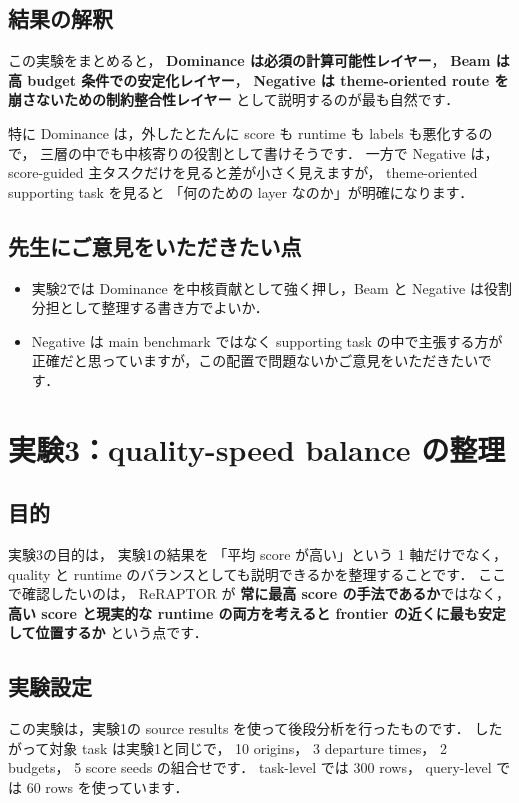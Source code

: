 \documentclass[a4paper,11pt]{article}
\newcommand{\reraptor}{ReRAPTOR}
\begin{document}
\subsection*{結果の解釈}
この実験をまとめると，
\textbf{Dominance は必須の計算可能性レイヤー}，
\textbf{Beam は高 budget 条件での安定化レイヤー}，
\textbf{Negative は theme-oriented route を崩さないための制約整合性レイヤー}
として説明するのが最も自然です．

特に Dominance は，外したとたんに score も runtime も labels も悪化するので，
三層の中でも中核寄りの役割として書けそうです．
一方で Negative は，
score-guided 主タスクだけを見ると差が小さく見えますが，
theme-oriented supporting task を見ると
「何のための layer なのか」が明確になります．

\subsection*{先生にご意見をいただきたい点}
\begin{itemize}
    \item 実験2では Dominance を中核貢献として強く押し，Beam と Negative は役割分担として整理する書き方でよいか．
    \item Negative は main benchmark ではなく supporting task の中で主張する方が正確だと思っていますが，この配置で問題ないかご意見をいただきたいです．
\end{itemize}

\clearpage
\section{実験3：quality-speed balance の整理}
\subsection*{目的}
実験3の目的は，
実験1の結果を
「平均 score が高い」という 1 軸だけでなく，
quality と runtime のバランスとしても説明できるかを整理することです．
ここで確認したいのは，
\reraptor{} が
\textbf{常に最高 score の手法であるか}ではなく，
\textbf{高い score と現実的な runtime の両方を考えると frontier の近くに最も安定して位置するか}
という点です．

\subsection*{実験設定}
この実験は，実験1の source results を使って後段分析を行ったものです．
したがって対象 task は実験1と同じで，
10 origins，
3 departure times，
2 budgets，
5 score seeds の組合せです．
task-level では 300 rows，
query-level では 60 rows を使っています．
\end{document}
